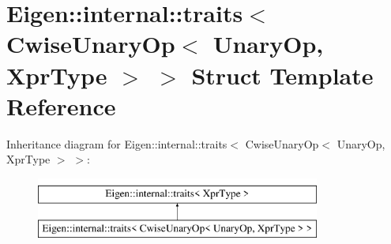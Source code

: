 \hypertarget{struct_eigen_1_1internal_1_1traits_3_01_cwise_unary_op_3_01_unary_op_00_01_xpr_type_01_4_01_4}{}\section{Eigen\+::internal\+::traits$<$ Cwise\+Unary\+Op$<$ Unary\+Op, Xpr\+Type $>$ $>$ Struct Template Reference}
\label{struct_eigen_1_1internal_1_1traits_3_01_cwise_unary_op_3_01_unary_op_00_01_xpr_type_01_4_01_4}
Inheritance diagram for Eigen\+::internal\+::traits$<$ Cwise\+Unary\+Op$<$ Unary\+Op, Xpr\+Type $>$ $>$\+:\begin{figure}[H]
\begin{center}
\leavevmode
\includegraphics[height=2.000000cm]{struct_eigen_1_1internal_1_1traits_3_01_cwise_unary_op_3_01_unary_op_00_01_xpr_type_01_4_01_4}
\end{center}
\end{figure}
